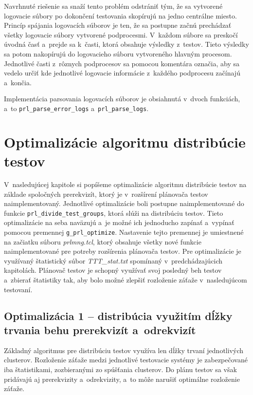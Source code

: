Navrhnuté riešenie sa snaží tento problém odstrániť tým, že sa vytvorené
logovacie súbory po dokončení testovania skopírujú na jedno centrálne miesto.
Princíp spájania logovacích súborov je ten, že sa postupne začnú prechádzať
všetky logovacie súbory vytvorené podprocesmi. 
V~každom súbore sa preskočí úvodná časť  a~prejde sa k~časti, 
ktorá obsahuje výsledky z~testov. Tieto výsledky sa potom nakopírujú
do logovacieho súboru vytvoreného hlavným procesom. 
Jednotlivé časti z~rôznych podprocesov sa pomocou komentára označia, 
aby sa vedelo určiť kde jednotlivé logovacie informácie z~každého 
podprocesu začínajú a~končia.

Implementácia parsovania logovacích súborov je obsiahnutá v~dvoch funkciách, 
a~to \texttt{prl\_parse\_error\_logs} a~\texttt{prl\_parse\_logs}. 
 


%
%
\chapter{Optimalizácie algoritmu distribúcie testov}
\label{kapitola:optimalizacie}
V~nasledujúcej kapitole si popíšeme optimalizácie algoritmu distribúcie
testov na základe spoločných prerekvizít, ktorý je v~rozšírení plánovača 
testov naimplementovaný. 
Jednotlivé optimalizácie boli postupne naimplementované do funkcie 
\texttt{prl\_divide\_test\_groups}, ktorá slúži na distribúciu testov.
Tieto optimalizácie na seba naväzujú a~je možné ich jednoducho zapínať a~vypínať 
pomocou  premennej \texttt{g\_prl\_optimize}. 
Nastavenie tejto premennej je umiestnené 
na začiatku súboru \textit{prlmng.tcl}, ktorý obsahuje všetky nové funkcie
naimplementované pre potreby rozšírenia plánovača testov.
Pre optimalizácie je využívaný štatistický súbor \textit{TTT\_stat.txt}
spomínaný v~predchádzajúcich kapitolách. Plánovač testov je schopný
využívať svoj posledný beh testov a~zbierať štatistiky tak, aby bolo možné
zlepšiť rozloženie záťaže v~nasledujúcom testovaní.

\section{Optimalizácia 1 -- distribúcia využitím dĺžky trvania behu 
prerekvizít a~odrekvizít}
\label{sekcia:optimalizacia1}
Základný algoritmus pre distribúciu testov využíva len dĺžky trvaní jednotlivých clusterov.
Rozloženie záťaže medzi jednotlivé testovacie systémy je zabezpečované iba
štatistikami, zozbieranými zo spúšťania clusterov.
Do plánu testov sa však pridávajú aj prerekvizity a~odrekvizity, a~to môže
narušiť optimálne rozloženie záťaže. 

